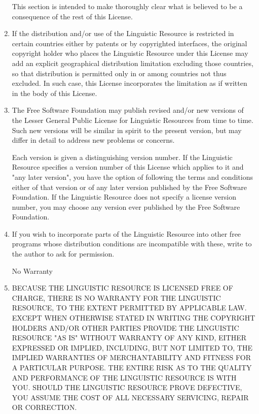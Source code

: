 \begin{enumerate}
This section is intended to make thoroughly clear what is believed to be a consequence 
of the rest of this License. 

\item

If the distribution and/or use of the Linguistic Resource is restricted in certain countries 
either by patents or by copyrighted interfaces, the original copyright holder who places the 
Linguistic Resource under this License may add an explicit geographical distribution limitation 
excluding those countries, so that distribution is permitted only in or among countries not thus 
excluded. In such case, this License incorporates the limitation as if written in the body of 
this License.


\item

The Free Software Foundation may publish revised and/or new versions of the Lesser General 
Public License for Linguistic Resources from time to time. Such new versions will be similar 
in spirit to the present version, but may differ in detail to address new problems or concerns.

Each version is given a distinguishing version number. If the Linguistic Resource specifies 
a version number of this License which applies to it and "any later version", you have the 
option of following the terms and conditions either of that version or of any later version 
published by the Free Software Foundation. If the Linguistic Resource does not specify a 
license version number, you may choose any version ever published by the Free Software Foundation. 



\item
If you wish to incorporate parts of the Linguistic Resource into other free programs whose 
distribution conditions are incompatible with these, write to the author to ask for permission.

\begin{center}
{\Large\sc
No Warranty
}
\end{center}

\item
{\sc BECAUSE THE LINGUISTIC RESOURCE IS LICENSED FREE OF CHARGE, THERE IS NO WARRANTY FOR 
THE LINGUISTIC RESOURCE, TO THE EXTENT PERMITTED BY APPLICABLE LAW. EXCEPT WHEN OTHERWISE 
STATED IN WRITING THE COPYRIGHT HOLDERS AND/OR OTHER PARTIES PROVIDE THE LINGUISTIC RESOURCE 
"AS IS" WITHOUT WARRANTY OF ANY KIND, EITHER EXPRESSED OR IMPLIED, INCLUDING, BUT NOT 
LIMITED TO, THE IMPLIED WARRANTIES OF MERCHANTABILITY AND FITNESS FOR A PARTICULAR PURPOSE. 
THE ENTIRE RISK AS TO THE QUALITY AND PERFORMANCE OF THE LINGUISTIC RESOURCE IS WITH YOU. 
SHOULD THE LINGUISTIC RESOURCE PROVE DEFECTIVE, YOU ASSUME THE COST OF ALL NECESSARY 
SERVICING, REPAIR OR CORRECTION.}


\end{enumerate}
